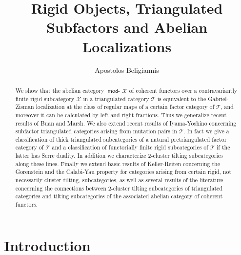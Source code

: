 \documentclass[oneside, a4paper,reqno]{amsart}
\numberwithin{equation}{section}
\theoremstyle{definition}
\begin{document}
\title[Rigid Localizations]{Rigid Objects, Triangulated Subfactors  and Abelian Localizations}

\author[A. Beligiannis]{Apostolos Beligiannis}
\address{Department of Mathematics, University of Ioannina, 45110
Ioannina, Greece}




\begin{abstract}
We show that the abelian category $\operatorname*{\mathsf{mod}-\!}{\mathcal X}$ of coherent functors over a contravariantly finite rigid subcategory ${\mathcal X}$ in a triangulated category ${\mathcal T}$ is equivalent to the Gabriel-Zisman localization at the class of regular maps of a certain factor category of ${\mathcal T}$, and moreover it can be calculated by left and right fractions.  Thus we generalize recent results of Buan and Marsh.  We also extend recent results of Iyama-Yoshino concerning subfactor triangulated categories arising from mutation pairs in ${\mathcal T}$. In fact we give a classification of thick triangulated subcategories of a natural pretriangulated factor category of ${\mathcal T}$ and a classification of functorially finite rigid subcategories of ${\mathcal T}$ if the latter has Serre duality. In addition we characterize $2$-cluster tilting subcategories along these lines. Finally we extend basic results of Keller-Reiten concerning the Gorenstein and the Calabi-Yau property for categories arising from certain rigid, not necessarily cluster tilting, subcategories, as  well as several results of the literature concerning the connections between $2$-cluster tilting subcategories of triangulated categories  and tilting subcategories of the associated abelian category of coherent functors.        
\end{abstract}

\maketitle

\setcounter{tocdepth}{1} \tableofcontents

 \section{Introduction}
 
\end{document}

